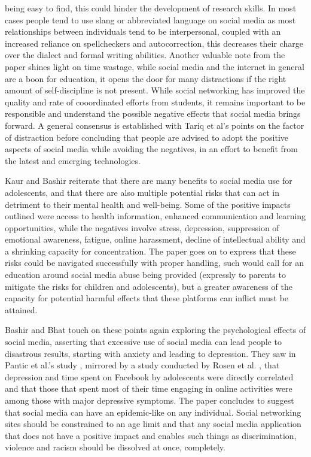 \documentclass[lettersize,journal]{IEEEtran}
\begin{document}
    being easy to find, this could hinder the development of research skills. In most cases people tend to use slang or
    abbreviated language on social media as most relationships between individuals tend to be interpersonal, coupled
    with an increased reliance on spellcheckers and autocorrection, this decreases their charge over the dialect and
    formal writing abilities. Another valuable note from the paper shines light on time wastage, while social media
    and the internet in general are a boon for education, it opens the door for many distractions if the right amount
    of self-discipline is not present. While social networking has improved the quality and rate of cooordinated
    efforts from students, it remains important to be responsible and understand the possible negative effects
    that social media brings forward. A general consensus is established with Tariq et al's \cite{Tariq et al 2012}
    points on the factor of distraction before concluding that people are advised to adopt the positive aspects of
    social media while avoiding the negatives, in an effort to benefit from the latest and emerging technologies.

    Kaur and Bashir \cite{Bashir et al 2015} reiterate that there are many benefits to social media use for adolescents, and that there
    are also multiple potential risks that can act in detriment to their mental health and well-being. Some
    of the positive impacts outlined were access to health information, enhanced communication and learning
    opportunities, while the negatives involve stress, depression, suppression of emotional awareness, fatigue,
    online harassment, decline of intellectual ability and a shrinking capacity for concentration. The paper goes
    on to express that these risks could be navigated successfully with proper handling, such would call for an
    education around social media abuse being provided (expressly to parents to mitigate the risks for children
    and adolescents), but a greater awareness of the capacity for potential harmful effects that these platforms
    can inflict must be attained.

    Bashir and Bhat \cite{Bashir et al 2017} touch on these points again exploring the psychological effects
    of social media, asserting that excessive use of social media can lead people to disastrous results, starting
    with anxiety and leading to depression. They saw in Pantic et al.'s study \cite{Pantic et al 2012}, mirrored
    by a study conducted by Rosen et al. \cite{Rosen et al 2013}, that depression and time spent on Facebook by
    adolescents were directly correlated and that those that spent most of their time engaging in online activities
    were among those with major depressive symptoms. The paper concludes to suggest that social media can have an
    epidemic-like on any individual. Social networking sites should be constrained to an age limit and that any
    social media application that does not have a positive impact and enables such things as discrimination, violence
    and racism should be dissolved at once, completely.
\end{document}
